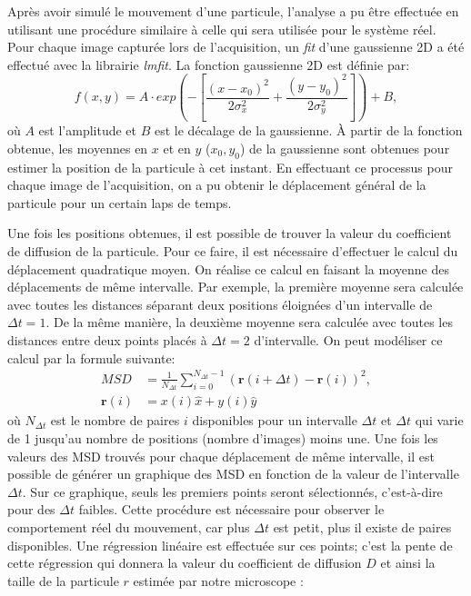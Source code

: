 \documentclass[conference]{IEEEtran}
\begin{document}
Après avoir simulé le mouvement d'une particule, l'analyse a pu être effectuée en utilisant une procédure similaire
à celle qui sera utilisée pour le système réel. Pour chaque image capturée lors de l'acquisition, un \textit{fit}
d'une gaussienne 2D a été effectué avec la librairie \textit{lmfit}. La fonction gaussienne 2D est définie par:
\begin{equation}
  f(x,y)=A\cdot exp\left(-\left[\frac{(x-x_0)^2}{2\sigma_x^2}+\frac{(y-y_0)^2}{2\sigma_y^2}\right]\right)+B,
\end{equation}
où $A$ est l'amplitude et $B$ est le décalage de la gaussienne. À partir de la fonction obtenue, les moyennes en $x$ et en $y$ ($x_0,y_0$) de la gaussienne sont obtenues
pour estimer la position de la particule à cet instant. En effectuant ce processus pour chaque image de l'acquisition,
on a pu obtenir le déplacement général de la particule pour un certain laps de temps.


Une fois les positions obtenues, il est possible de trouver la valeur du coefficient de diffusion de la particule. 
Pour ce faire, il est nécessaire d'effectuer le calcul du déplacement quadratique moyen. On réalise ce calcul en faisant la moyenne des déplacements de même intervalle. Par exemple, 
la première moyenne sera calculée avec toutes les distances séparant deux positions éloignées d'un intervalle de $\Delta t=1$. De la même manière, la deuxième moyenne sera calculée avec toutes les distances
entre deux points placés à $\Delta t=2$ d'intervalle. On peut modéliser ce calcul par la formule suivante: 
\begin{align}
  MSD &= \frac{1}{N_{\Delta t}} \sum_{i=0}^{N_{\Delta t} - 1} \left( \mathbf{r}(i+\Delta t) - \mathbf{r}(i) \right)^2,\\ 
  \mathbf{r}(i) &= x(i)\hat{x}+ y(i)\hat{y}
\end{align}
où $N_{\Delta t}$ est le nombre de paires $i$ disponibles pour un intervalle $\Delta t$ et $\Delta t$ qui varie de 1 jusqu'au nombre de positions (nombre d'images) moins une. 
Une fois les valeurs des MSD
trouvés pour chaque déplacement de même intervalle, il est possible de générer un graphique 
des MSD en fonction de la valeur de l'intervalle $\Delta t$. Sur ce graphique, seuls les premiers points seront sélectionnés, c'est-à-dire pour des $\Delta t$ faibles.
Cette procédure est nécessaire pour observer le comportement réel du mouvement, car plus $\Delta t$ est petit, plus il existe de paires disponibles. 
Une régression linéaire est effectuée sur
ces points; c'est la pente de cette régression qui donnera la valeur du coefficient de diffusion $D$ et ainsi la taille de la particule $r$ estimée par notre microscope :
\end{document}
